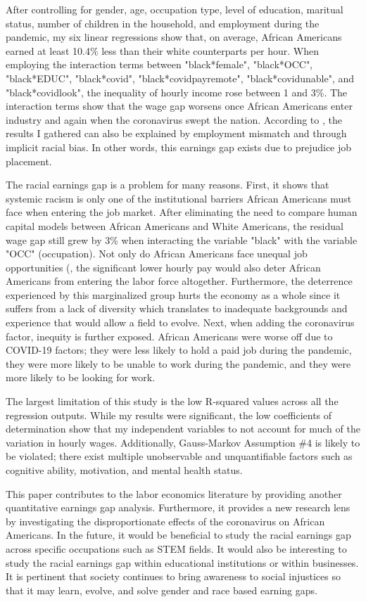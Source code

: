 \documentclass[12pt, english]{article}
\begin{document}
After controlling for gender, age, occupation type, level of education, maritual status, number of children in the household, and employment during the pandemic, my six linear regressions show that, on average, African Americans earned at least 10.4\% less than their white counterparts per hour. When employing the interaction terms between "black*female", "black*OCC", "black*EDUC", "black*covid", "black*covidpayremote", "black*covidunable", and "black*covidlook", the inequality of hourly income rose between 1 and 3\%. The interaction terms show that the wage gap worsens once African Americans enter industry and again when the coronavirus swept the nation. According to \citet{LuLi2021}, the results I gathered can also be explained by employment mismatch and through implicit racial bias. In other words, this earnings gap exists due to prejudice job placement. 

The racial earnings gap is a problem for many reasons. First, it shows that systemic racism is only one of the institutional barriers African Americans must face when entering the job market. After eliminating the need to compare human capital models between African Americans and White Americans, the residual wage gap still grew by 3\% when interacting the variable "black" with the variable "OCC" (occupation). Not only do African Americans face unequal job opportunities (\citet{LuLi2021}, the significant lower hourly pay would also deter African Americans from entering the labor force altogether. Furthermore, the deterrence experienced by this marginalized group hurts the economy as a whole since it suffers from a lack of diversity which translates to inadequate backgrounds and experience that would allow a field to evolve. Next, when adding the coronavirus factor, inequity is further exposed. African Americans were worse off due to COVID-19 factors; they were less likely to hold a paid job during the pandemic, they were more likely to be unable to work during the pandemic, and they were more likely to be looking for work.

The largest limitation of this study is the low R-squared values across all the regression outputs. While my results were significant, the low coefficients of determination show that my independent variables to not account for much of the variation in hourly wages. Additionally, Gauss-Markov Assumption \#4 is likely to be violated; there exist multiple unobservable and unquantifiable factors such as cognitive ability, motivation, and mental health status.

This paper contributes to the labor economics literature by providing another quantitative earnings gap analysis. Furthermore, it provides a new research lens by investigating the disproportionate effects of the coronavirus on African Americans. In the future, it would be beneficial to study the racial earnings gap across specific occupations such as STEM fields. It would also be interesting to study the racial earnings gap within educational institutions or within businesses. It is pertinent that society continues to bring awareness to social injustices so that it may learn, evolve, and solve gender and race based earning gaps.

\nocite{*}

\end{document}
